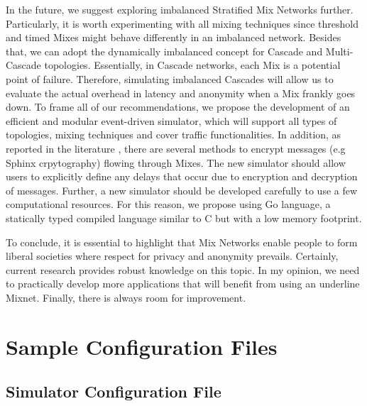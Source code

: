 \documentclass[logo,msc,cyber]{infthesis}   %
\begin{document}
In the future, we suggest exploring imbalanced Stratified Mix Networks further.
Particularly, it is worth experimenting with all mixing techniques since
threshold and timed Mixes might behave differently in an imbalanced network.
Besides that, we can adopt the dynamically imbalanced concept for Cascade and
Multi-Cascade topologies. Essentially, in Cascade networks, each Mix is a
potential point of failure. Therefore,  simulating imbalanced Cascades will
allow us to evaluate the actual overhead in latency and anonymity when a Mix
frankly goes down. To frame all of our recommendations, we propose the
development of an efficient and modular event-driven simulator, which will
support all types of topologies, mixing techniques and cover traffic
functionalities. In addition, as reported in the literature
\cite{KatzMixnet,chaum1981untraceable}, there are several methods to encrypt
messages (e.g Sphinx crpytography) flowing through Mixes. The new simulator
should allow users to explicitly define any delays that occur due to encryption
and decryption of messages. Further, a new simulator should be developed
carefully to use a few computational resources. For this reason, we propose
using Go language, a statically typed compiled language similar to C but with a
low memory footprint.

To conclude, it is essential to highlight that Mix Networks enable people to form
liberal societies where respect for privacy and anonymity prevails. Certainly,
current research provides robust knowledge on this topic. In my opinion, we need
to practically develop more applications that will benefit from using an
underline Mixnet. Finally, there is always room for improvement.





\appendix

\chapter{Sample Configuration Files}

\section{Simulator Configuration File}
\label{appendix:a1}
\end{document}
